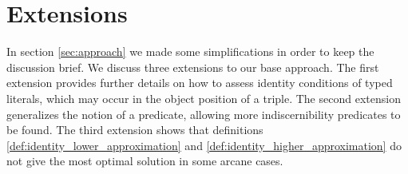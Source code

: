 \section{Extensions}
\label{sec:extensions}

In section \ref{sec:approach} 
  we made some simplifications in order to keep the discussion brief.
We discuss three extensions to our base approach.
The first extension provides further details on how to assess
  identity conditions of typed literals, which may occur in the object
  position of a triple.
The second extension generalizes the notion of a
  predicate, allowing more indiscernibility predicates to be found.
The third extension shows that definitions
  \ref{def:identity_lower_approximation} and
  \ref{def:identity_higher_approximation}
  do not give the most optimal solution in some arcane cases.




